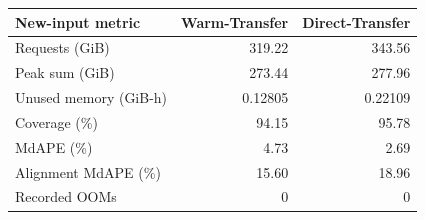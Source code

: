 \begin{tabular}{@{}lrr@{}}
\toprule
New-input metric & Warm-Transfer & Direct-Transfer\\
\midrule
Requests (GiB) & 319.22 & 343.56 \\
Peak sum (GiB) & 273.44 & 277.96 \\
Unused memory (GiB-h) & 0.12805 & 0.22109 \\
Coverage (\%) & 94.15 & 95.78 \\
MdAPE (\%) & 4.73 & 2.69 \\
Alignment MdAPE (\%) & 15.60 & 18.96 \\
Recorded OOMs & 0 & 0 \\
\bottomrule
\end{tabular}
